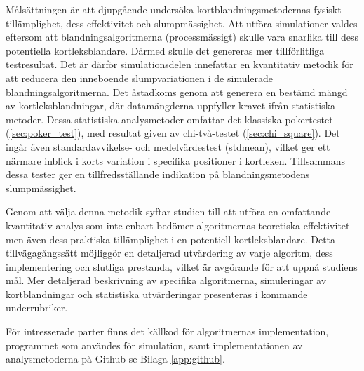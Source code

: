 \documentclass[swedish,a4paper]{article}
\begin{document}
Målsättningen är att djupgående undersöka kortblandningsmetodernas
fysiskt tillämplighet, dess effektivitet och slumpmässighet. Att utföra 
simulationer valdes eftersom att blandningsalgoritmerna
(processmässigt) skulle vara snarlika till dess potentiella kortleks\-blandare.
Därmed skulle det genereras mer tillförlitliga testresultat. Det är därför simulationsdelen
innefattar en kvantitativ metodik för att reducera den inneboende
slumpvariationen i de simulerade blandningsalgoritmerna. Det åstadkoms genom att generera en bestämd
mängd av kortleksblandningar, där datamängderna uppfyller kravet ifrån statistiska metoder. Dessa
statistiska  analysmetoder omfattar det klassiska pokertestet (\ref{sec:poker_test}), med
resultat given av chi-två-testet (\ref{sec:chi_square}). Det ingår även standardavvikelse- och medelvärdestest (\gls{stdmean}), vilket ger ett närmare inblick i korts variation i specifika
positioner i kortleken. Tillsammans dessa tester ger en tillfredsställande indikation på
blandningsmetodens slumpmässighet. 

Genom att välja denna metodik syftar studien till att utföra en omfattande
kvantitativ analys som inte enbart bedömer algoritmernas teoretiska
effektivitet men även dess praktiska tillämplighet i en potentiell kortleks\-blandare.
Detta tillvägagångssätt möjliggör en detaljerad utvärdering av varje algoritm,
dess implementering och slutliga prestanda, vilket är avgörande för att uppnå
studiens mål. Mer detaljerad beskrivning av specifika algoritmerna,
simuleringar av kortblandningar och statistiska utvärderingar presenteras i kommande 
underrubriker. 

För intresserade parter finns det källkod för algoritmernas implementation,
programmet som användes för simulation, samt implementationen av analysmetoderna
på Github se Bilaga \ref{app:github}.

%
%
\end{document}
